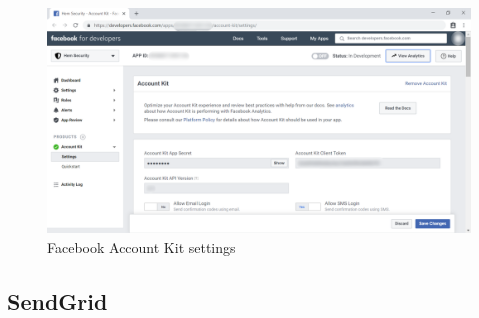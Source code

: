 \begin{enumerate}
\begin{center}
	      	\begin{figure}[H]
	      		\centering
	      		\includegraphics[width=0.6\columnwidth]{images/appendixA/Facebook-AccountKit-Settings.png}
	      		\caption{Facebook Account Kit settings}
	      	\end{figure}
	      \end{center}
\end{enumerate}
\vspace{-1cm}
\tocless\subsection{SendGrid}
